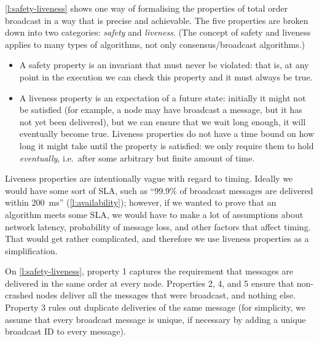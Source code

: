 \autoref{l:safety-liveness} shows one way of formalising the properties of total order broadcast in a way that is precise and achievable.
The five properties are broken down into two categories: \emph{safety} and \emph{liveness}.
(The concept of safety and liveness applies to many types of algorithms, not only consensus/broadcast algorithms.)

\begin{itemize}
    \item A safety property is an invariant that must never be violated: that is, at any point in the execution we can check this property and it must always be true.
    \item A liveness property is an expectation of a future state: initially it might not be satisfied (for example, a node may have broadcast a message, but it has not yet been delivered), but we can ensure that we wait long enough, it will eventually become true.
        Liveness properties do not have a time bound on how long it might take until the property is satisfied: we only require them to hold \emph{eventually}, i.e.\ after some arbitrary but finite amount of time.
\end{itemize}


Liveness properties are intentionally vague with regard to timing.
Ideally we would have some sort of SLA, such as ``99.9\% of broadcast messages are delivered within 200~ms'' (\autoref{l:availability}); however, if we wanted to prove that an algorithm meets some SLA, we would have to make a lot of assumptions about network latency, probability of message loss, and other factors that affect timing.
That would get rather complicated, and therefore we use liveness properties as a simplification.

On \autoref{l:safety-liveness}, property 1 captures the requirement that messages are delivered in the same order at every node.
Properties 2, 4, and 5 ensure that non-crashed nodes deliver all the messages that were broadcast, and nothing else.
Property 3 rules out duplicate deliveries of the same message (for simplicity, we assume that every broadcast message is unique, if necessary by adding a unique broadcast ID to every message).


